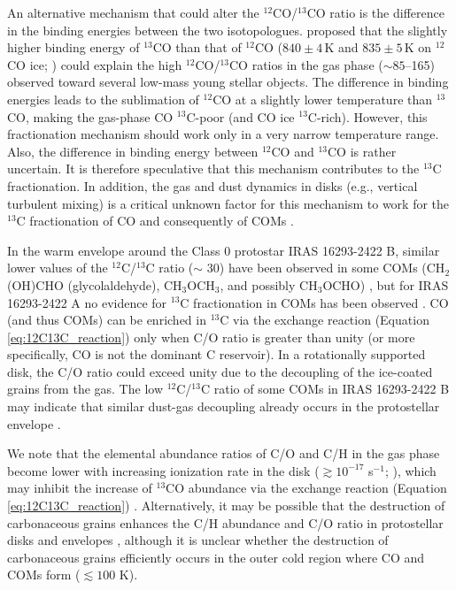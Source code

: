 \documentclass[linenumbers, twocolumn, twocolappendix, astrosymb, times]{aastex631}
\newcommand{\methylformate}{CH$_3$OCHO\xspace}
\newcommand{\dimethylether}{CH$_3$OCH$_3$\xspace}
\begin{document}
An alternative mechanism that could alter the $^{12}$CO/$^{13}$CO ratio is the difference in the binding energies between the two isotopologues. \citet{Smith2015} proposed that the slightly higher binding energy of $^{13}$CO than that of $^{12}$CO ($840\pm4$\,K and $835\pm5$\,K on $^{12}$CO ice; \citealt{Smith2021}) could explain the high $^{12}$CO/$^{13}$CO ratios in the gas phase ($\sim85$--165) observed toward several low-mass young stellar objects. The difference in binding energies leads to the sublimation of $^{12}$CO at a slightly lower temperature than $^{13}$CO, making the gas-phase CO $^{13}$C-poor (and CO ice $^{13}$C-rich). However, this fractionation mechanism should work only in a very narrow temperature range. Also, the difference in binding energy between $^{12}$CO and $^{13}$CO is rather uncertain. It is therefore speculative that this mechanism contributes to the $^{13}$C fractionation. In addition, the gas and dust dynamics in disks (e.g., vertical turbulent mixing) is a critical unknown factor for this mechanism to work for the $^{13}$C fractionation of CO and consequently of COMs \citep[e.g.,][]{Yoshida2022_12CO13CO}.


In the warm envelope around the Class 0 protostar IRAS 16293-2422 B, similar lower values of the $^{12}$C/$^{13}$C ratio ($\sim$ 30) have been observed in some COMs (CH$_2$(OH)CHO (glycolaldehyde), \dimethylether, and possibly \methylformate) \citep[see Table \ref{tab:12C13C_summary};][]{Jorgensen2016, Jorgensen2018}, but for IRAS 16293-2422 A no evidence for $^{13}$C fractionation in COMs has been observed \citep[Table \ref{tab:12C13C_summary};][]{Manigand2020}. CO (and thus COMs) can be enriched in $^{13}$C via the exchange reaction (Equation \ref{eq:12C13C_reaction}) only when C/O ratio is greater than unity (or more specifically, CO is not the dominant C reservoir). In a rotationally supported disk, the C/O ratio could exceed unity due to the decoupling of the ice-coated grains from the gas. The low $^{12}$C/$^{13}$C ratio of some COMs in IRAS 16293-2422 B may indicate that similar dust-gas decoupling already occurs in the protostellar envelope \citep[e.g.,][]{Koga2022}. 

We note that the elemental abundance ratios of C/O and C/H in the gas phase become lower with increasing ionization rate in the disk ($\gtrsim10^{-17}$ s$^{-1}$; \citealt{Eistrup2016, Schwarz2018, Notsu2020}), which may inhibit the increase of $^{13}$CO abundance via the exchange reaction (Equation \ref{eq:12C13C_reaction}) \citep{Woods2009}. Alternatively, it may be possible that the destruction of carbonaceous grains enhances the C/H abundance and C/O ratio in protostellar disks and envelopes \citep[e.g.,][]{Wei2019, vantHoff2020}, although it is unclear whether the destruction of carbonaceous grains efficiently occurs in the outer cold region where CO and COMs form ($\lesssim100$ K).
\end{document}
